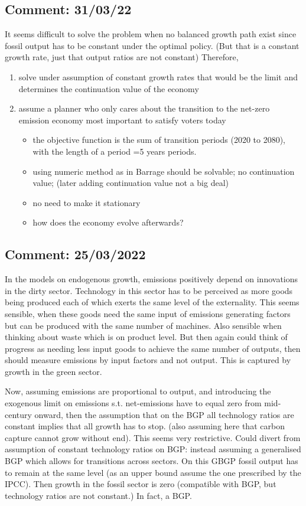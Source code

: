
\subsection*{Comment: 31/03/22}
It seems difficult to solve the problem when no balanced growth path exist since fossil output has to be constant under the optimal policy. (But that is a constant growth rate, just that output ratios are not constant) 
Therefore,
\begin{enumerate}
	\item solve under assumption of constant growth rates \ar that would be the limit and determines the continuation value of the economy
	\item assume a planner who only cares about the transition to the net-zero emission economy \ar most important to satisfy voters today
	\begin{itemize}
		\item the objective function is the sum of transition periods (2020 to 2080), with the length of a period =5 years  periods.
		\item using numeric method as in Barrage should be solvable; no continuation value; (later adding continuation value not a big deal)
		\item no need to make it stationary
		\item how does the economy evolve afterwards?
	\end{itemize}

\end{enumerate}
\subsection*{Comment: 25/03/2022}
In the models on endogenous growth, emissions positively depend on innovations in the dirty sector. Technology in this sector has to be perceived as more goods being produced each of which exerts the same level of the externality. This seems sensible, when these goods need the same input of emissions generating factors but can be produced with the same number of machines. Also sensible when thinking about waste which is on product level. But then again could think of progress as needing less input goods to achieve the same number of outputs, then should measure emissions by input factors and not output. This is captured by growth in the green sector.

Now, assuming emissions are proportional to output, and introducing the exogenous limit on emissions s.t. net-emissions have to equal zero from mid-century onward, then the assumption that on the BGP all technology ratios are constant implies that all growth has to stop. (also assuming here that carbon capture cannot grow without end). This seems very restrictive. Could divert from assumption of constant technology ratios on BGP: instead assuming a generalised BGP which allows for transitions across sectors.  On this GBGP fossil output has to remain at the same level (as an upper bound assume the one prescribed by the IPCC). Then growth in the fossil sector is zero (compatible with BGP, but technology ratios are not constant.) In fact, a BGP. 

